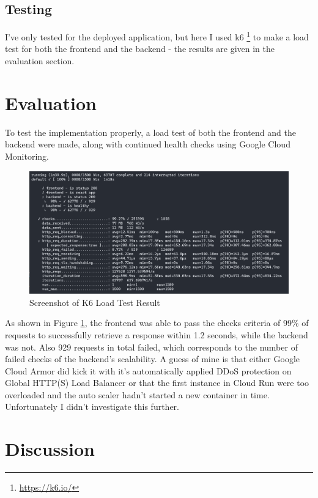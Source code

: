 \documentclass[11pt]{article}
\begin{document}
\subsection{Testing}
I've only tested for the deployed application, but here I used k6 \footnote{\href{https://k6.io/}{https://k6.io/}} to make a load test for both the frontend and the backend - the results are given in the evaluation section.


\section{Evaluation}

To test the implementation properly, a load test of both the frontend and the backend were made, along with continued health checks using Google Cloud Monitoring.

\begin{figure}[h]
	\centering
	\includegraphics[width=0.7\linewidth]{scr_k6_loadtest}
	\caption{Screenshot of K6 Load Test Result}
	\label{fig:scr:k6:loadtest}
\end{figure}

As shown in Figure \ref{fig:scr:k6:loadtest}, the frontend was able to pass the checks criteria of 99\% of requests to successfully retrieve a response within 1.2 seconds, while the backend was not. Also 929 requests in total failed, which corresponds to the number of failed checks of the backend's scalability. A guess of mine is that either Google Cloud Armor did kick it with it's automatically applied DDoS protection on Global HTTP(S) Load Balancer or that the first instance in Cloud Run were too overloaded and the auto scaler hadn't started a new container in time. Unfortunately I didn't investigate this further.

\section{Discussion}
\end{document}
